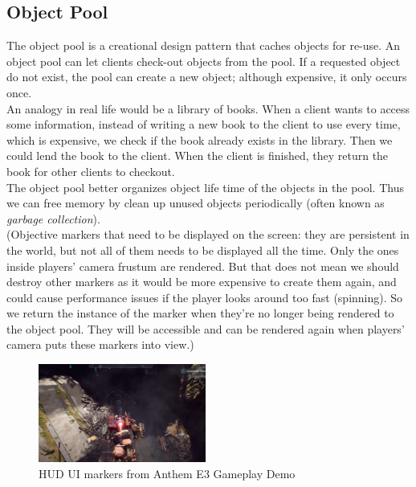 \iftwocolumns
\begin{multicols}{2}
\fi

\subsection{Object Pool}
The object pool is a creational design pattern that caches objects for re-use. An object pool can let clients check-out objects from the pool. If a requested object do not exist, the pool can create a new object; although expensive, it only occurs once.\bs
\\
An analogy in real life would be a library of books. When a client wants to access some information, instead of writing a new book to the client to use every time, which is expensive, we check if the book already exists in the library. Then we could lend the book to the client. When the client is finished, they return the book for other clients to checkout.\bs
\\
The object pool better organizes object life time of the objects in the pool. Thus we can free memory by clean up unused objects periodically (often known as \textit{garbage collection}).\bs
\\


(Objective markers that need to be displayed on the screen: they are persistent in the world, but not all of them needs to be displayed all the time. Only the ones inside players' camera frustum are rendered. But that does not mean we should destroy other markers as it would be more expensive to create them again, and could cause performance issues if the player looks around too fast (spinning). So we return the instance of the marker when they're no longer being rendered to the object pool. They will be accessible and can be rendered again when players' camera puts these markers into view.)

\begin{figure}[H]
	\centering
	\includegraphics[width=0.49\textwidth]{assets/anthem-markers}
	\caption{HUD UI markers from Anthem E3 Gameplay Demo\cite{anthem-e3}}
	\label{fig:anthem-hud-markers}
\end{figure}


\end{multicols}

